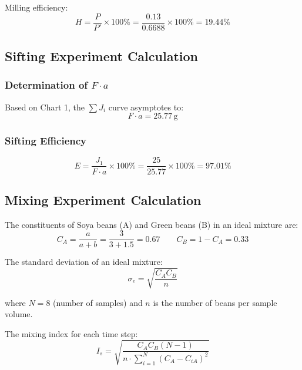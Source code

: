 Milling efficiency:
\begin{equation}
    H = \frac{P}{P'} \times 100\% = \frac{0.13}{0.6688} \times 100\% = 19.44\%
\end{equation}

\subsection{Sifting Experiment Calculation}

\subsubsection{Determination of $F \cdot a$}

Based on Chart 1, the $\sum J_i$ curve asymptotes to:
\begin{equation*}
    F \cdot a = 25.77\,\text{g}
\end{equation*}

\subsubsection{Sifting Efficiency}
\begin{equation}
    E = \frac{J_1}{F \cdot a} \times 100\% = \frac{25}{25.77} \times 100\% = 97.01\%
\end{equation}

\subsection{Mixing Experiment Calculation}

The constituents of Soya beans (A) and Green beans (B) in an ideal mixture are:
\begin{equation*}
    C_A = \frac{a}{a+b} = \frac{3}{3+1.5} = 0.67
    \qquad
    C_B = 1 - C_A = 0.33
\end{equation*}

The standard deviation of an ideal mixture:
\begin{equation*}
    \sigma_e = \sqrt{\frac{C_A C_B}{n}}
\end{equation*}

where $N = 8$ (number of samples) and $n$ is the number of beans per sample volume.

The mixing index for each time step:
\begin{equation*}
    I_s = \sqrt{\frac{C_A C_B (N-1)}{n \cdot \sum_{i=1}^{N}(C_A - C_{iA})^2}}
\end{equation*}
